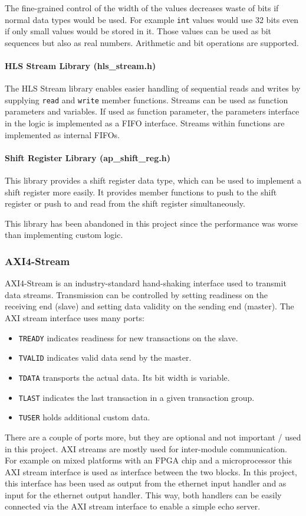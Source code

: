 The fine-grained control of the width of the values decreases waste of bits if normal data types would be used. For example \texttt{int} values would use 32 bits even if only small values would be stored in it.
Those values can be used as bit sequences but also as real numbers. Arithmetic and bit operations are supported.

\paragraph{HLS Stream Library (hls\_stream.h)}
The HLS Stream library enables easier handling of sequential reads and writes by supplying \texttt{read} and \texttt{write} member functions. Streams can be used as function parameters and variables. If used as function parameter, the parameters interface in the logic is implemented as a FIFO interface. Streams within functions are implemented as internal FIFOs.

\paragraph{Shift Register Library (ap\_shift\_reg.h)}
This library provides a shift register data type, which can be used to implement a shift register more easily. It provides member functions to push to the shift register or push to and read from the shift register simultaneously.

This library has been abandoned in this project since the performance was worse than implementing custom logic.

\subsubsection{AXI4-Stream}
AXI4-Stream is an industry-standard hand-shaking interface used to transmit data streams. Transmission can be controlled by setting readiness on the receiving end (slave) and setting data validity on the sending end (master). The AXI stream interface uses many ports:
\begin{itemize}
  \item \texttt{TREADY} indicates readiness for new transactions on the slave.
  \item \texttt{TVALID} indicates valid data send by the master.
  \item \texttt{TDATA} transports the actual data. Its bit width is variable.
  \item \texttt{TLAST} indicates the last transaction in a given transaction group.
  \item \texttt{TUSER} holds additional custom data.
\end{itemize}

There are a couple of ports more, but they are optional and not important / used in this project.
AXI streams are mostly used for inter-module communication. For example on mixed platforms with an FPGA chip and a microprocessor this AXI stream interface is used as interface between the two blocks. In this project, this interface has been used as output from the ethernet input handler and as input for the ethernet output handler. This way, both handlers can be easily connected via the AXI stream interface to enable a simple echo server.